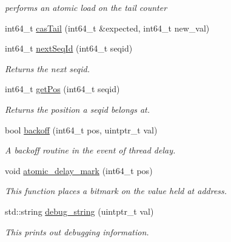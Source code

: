 \begin{DoxyCompactItemize}
\begin{DoxyCompactList}\small\item\em performs an atomic load on the tail counter \end{DoxyCompactList}\item 
int64\+\_\+t \hyperlink{classtervel_1_1containers_1_1wf_1_1_ring_buffer_a9c808379ab96e7d55d23168530ff4505}{cas\+Tail} (int64\+\_\+t \&expected, int64\+\_\+t new\+\_\+val)
\item 
int64\+\_\+t \hyperlink{classtervel_1_1containers_1_1wf_1_1_ring_buffer_aca988376ab980bce614ddbe0c279af73}{next\+Seq\+Id} (int64\+\_\+t seqid)
\begin{DoxyCompactList}\small\item\em Returns the next seqid. \end{DoxyCompactList}\item 
int64\+\_\+t \hyperlink{classtervel_1_1containers_1_1wf_1_1_ring_buffer_a909965b7e584d94ceedec35f5d06399e}{get\+Pos} (int64\+\_\+t seqid)
\begin{DoxyCompactList}\small\item\em Returns the position a seqid belongs at. \end{DoxyCompactList}\item 
bool \hyperlink{classtervel_1_1containers_1_1wf_1_1_ring_buffer_a54a5d1b842d3a70708d64460948628bd}{backoff} (int64\+\_\+t pos, uintptr\+\_\+t val)
\begin{DoxyCompactList}\small\item\em A backoff routine in the event of thread delay. \end{DoxyCompactList}\item 
void \hyperlink{classtervel_1_1containers_1_1wf_1_1_ring_buffer_aed86f62144a5709a09273cfd9b64d28a}{atomic\+\_\+delay\+\_\+mark} (int64\+\_\+t pos)
\begin{DoxyCompactList}\small\item\em This function places a bitmark on the value held at address. \end{DoxyCompactList}\item 
std\+::string \hyperlink{classtervel_1_1containers_1_1wf_1_1_ring_buffer_a2ea530f34dec3354636c48c28066b320}{debug\+\_\+string} (uintptr\+\_\+t val)
\begin{DoxyCompactList}\small\item\em This prints out debugging information. \end{DoxyCompactList}\end{DoxyCompactItemize}
